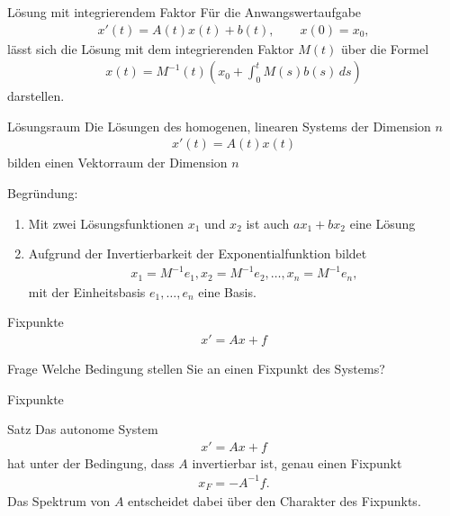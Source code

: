 \begin{frame}
  \begin{block}{Lösung mit integrierendem Faktor}
    Für die Anwangswertaufgabe
    \begin{gather*}
      x'(t) = A(t)x(t)+ b(t),
      \qquad
      x(0) = x_0,
    \end{gather*}
    lässt sich die Lösung mit dem integrierenden Faktor $M(t)$ über die Formel
    \begin{gather*}
      x(t) = M^{-1}(t)
      \left(
        x_0 + \int_0^t M(s) b(s) \,ds
      \right)
    \end{gather*}
    darstellen.
  \end{block}
\end{frame}

\begin{frame}
  \begin{block}{Lösungsraum}
    Die Lösungen des homogenen, linearen Systems der Dimension $n$
    \begin{gather*}
      x'(t) = A(t)x(t)
    \end{gather*}
    bilden einen Vektorraum der Dimension $n$
  \end{block}
  \pause
  Begründung:
  \begin{enumerate}
  \item Mit zwei Lösungsfunktionen $x_1$ und $x_2$ ist auch
    $ax_1+bx_2$ eine Lösung
  \item Aufgrund der Invertierbarkeit der Exponentialfunktion bildet
    \begin{gather*}
      x_1 = M^{-1} e_1, x_2 = M^{-1} e_2,\dots, x_n = M^{-1} e_n,
    \end{gather*}
    mit der Einheitsbasis $e_1,\dots,e_n$ eine Basis.
  \end{enumerate}
\end{frame}

\begin{frame}{Fixpunkte}
  \begin{gather*}
    x' = Ax+f
  \end{gather*}
  \begin{exampleblock}{Frage}
    Welche Bedingung stellen Sie an einen Fixpunkt des Systems?
  \end{exampleblock}
\end{frame}


\begin{frame}{Fixpunkte}
  \begin{block}{Satz}
  Das autonome System
  \begin{gather*}
    x' = Ax+f
  \end{gather*}
  hat unter der Bedingung, dass $A$ invertierbar ist, genau einen Fixpunkt
  \begin{gather*}
    x_F = -A^{-1}f.
  \end{gather*}
  Das Spektrum von $A$ entscheidet dabei über den Charakter des Fixpunkts.    
  \end{block}
\end{frame}


